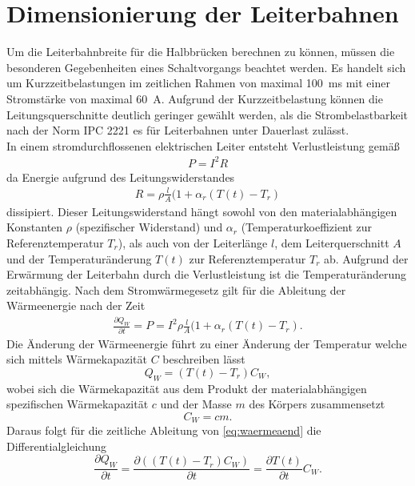 \section{Dimensionierung der Leiterbahnen}
Um die Leiterbahnbreite für die Halbbrücken berechnen zu können, müssen die besonderen Gegebenheiten eines Schaltvorgangs beachtet werden. Es handelt sich um Kurzzeitbelastungen im zeitlichen Rahmen von maximal \SI{100}{ms} mit einer Stromstärke von maximal \SI{60}{A}. Aufgrund der Kurzzeitbelastung können die Leitungsquerschnitte deutlich geringer gewählt werden, als die Strombelastbarkeit nach der Norm IPC 2221 es für Leiterbahnen unter Dauerlast zulässt.\\
In einem stromdurchflossenen elektrischen Leiter entsteht Verlustleistung gemäß
\begin{align*}
P = I^{2}R
\end{align*}
da Energie aufgrund des Leitungswiderstandes 
\begin{align*}
R = \rho \frac{l}{A}(1+\alpha_{r}(T(t)-T_{r})
\end{align*}
dissipiert. Dieser Leitungswiderstand hängt sowohl von den materialabhängigen Konstanten $\rho$ (spezifischer Widerstand) und $\alpha_{r}$ (Temperaturkoeffizient zur Referenztemperatur $T_{r}$), als auch von der Leiterlänge $l$, dem Leiterquerschnitt $A$ und der Temperaturänderung $T(t)$ zur Referenztemperatur $T_{r}$ ab. Aufgrund der Erwärmung der Leiterbahn durch die Verlustleistung ist die Temperaturänderung zeitabhängig. Nach dem Stromwärmegesetz gilt für die Ableitung der Wärmeenergie nach der Zeit
\begin{align}
\label{eq:dif2}
\frac{\partial Q_{W}}{\partial t} = P = I^{2}\rho \frac{l}{A}(1+\alpha_{r}(T(t)-T_{r}).
\end{align}
Die Änderung der Wärmeenergie führt zu einer Änderung der Temperatur welche sich mittels Wärmekapazität $C$ beschreiben lässt
\begin{equation}
\label{eq:waermeaend}
 Q_{W} = (T(t)-T_{r})C_W,
\end{equation}
wobei sich die Wärmekapazität aus dem Produkt der materialabhängigen spezifischen Wärmekapazität $c$ und der Masse $m$ des Körpers zusammensetzt
\begin{equation}
C_W = c m.
\end{equation}
Daraus folgt für die zeitliche Ableitung von \autoref{eq:waermeaend} die Differentialgleichung
\begin{equation}
\label{eq:dif1}
\frac{\partial Q_W}{\partial t} = \frac{\partial ((T(t)-T_{r})C_W)}{\partial t} = \frac{\partial T(t)}{\partial t}C_W.
\end{equation}
